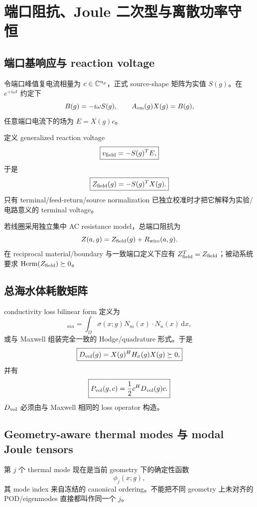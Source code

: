 \section{端口阻抗、Joule 二次型与离散功率守恒}

\subsection{端口基响应与 reaction voltage}
令端口峰值复电流相量为 $c\in\mathbb{C}^{n_p}$，正式 source-shape 矩阵为实值 $S(g)$。在 $e^{+i\omega t}$ 约定下
\begin{equation}
B(g)=-i\omega S(g),\qquad A_{\rm em}(g)X(g)=B(g),
\end{equation}
任意端口电流下的场为 $E=X(g)c$。

定义 generalized reaction voltage
\begin{equation}
\boxed{v_{\rm field}=-S(g)^TE,}
\end{equation}
于是
\begin{equation}
\boxed{Z_{\rm field}(g)=-S(g)^TX(g).}
\end{equation}
只有 terminal/feed-return/source normalization 已独立校准时才把它解释为实验/电路意义的 terminal voltage。

若线圈采用独立集中 AC resistance model，总端口阻抗为
\begin{equation}
Z(a,g)=Z_{\rm field}(g)+R_{\rm wire}(a,g).
\end{equation}
在 reciprocal material/boundary 与一致端口定义下应有 $Z_{\rm field}^T=Z_{\rm field}$；被动系统要求 $\operatorname{Herm}(Z_{\rm field})\succeq0$。

\subsection{总海水体耗散矩阵}
conductivity loss bilinear form 定义为
\begin{equation}
[H_\sigma(g)]_{mn}
=\int_\Omega\sigma(x;g)N_m(x)\cdot N_n(x)\,\mathrm dx,
\end{equation}
或与 Maxwell 组装完全一致的 Hodge/quadrature 形式。于是
\begin{equation}
\boxed{D_{\rm vol}(g)=X(g)^HH_\sigma(g)X(g)\succeq0,}
\end{equation}
并有
\begin{equation}
\boxed{P_{\rm vol}(g,c)=\frac12c^HD_{\rm vol}(g)c.}
\end{equation}
$D_{\rm vol}$ 必须由与 Maxwell 相同的 loss operator 构造。

\subsection{Geometry-aware thermal modes 与 modal Joule tensors}
第 $j$ 个 thermal mode 现在是当前 geometry 下的确定性函数
\begin{equation}
\phi_j(x;g),
\end{equation}
其 mode index 来自冻结的 canonical ordering。不能把不同 geometry 上未对齐的 POD/eigenmodes 直接都叫作同一个 $j$。

